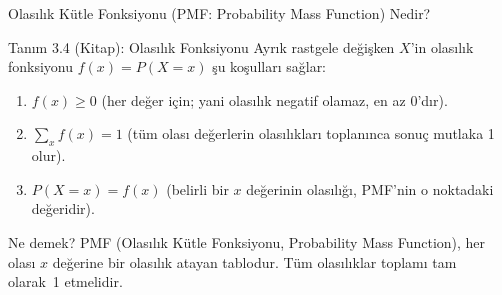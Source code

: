 ﻿\documentclass[light]{lutbeamer}
\begin{document}
\begin{frame}{Olasılık Kütle Fonksiyonu (PMF: Probability Mass Function) Nedir?}
\begin{block}{Tanım 3.4 (Kitap): Olasılık Fonksiyonu}
  Ayrık rastgele değişken $X$'in olasılık fonksiyonu $f(x) = P(X = x)$ şu koşulları sağlar:
  \begin{enumerate}
    \item $f(x) \ge 0$ \quad (her değer için; yani olasılık negatif olamaz, en az 0'dır).
    \item $\displaystyle\sum_{x} f(x) = 1$ \quad (tüm olası değerlerin olasılıkları toplanınca sonuç mutlaka 1 olur).
    \item $P(X = x) = f(x)$ \quad (belirli bir $x$ değerinin olasılığı, PMF'nin o noktadaki değeridir).
  \end{enumerate}
\end{block}

\begin{exampleblock}{Ne demek?}
  PMF (Olasılık Kütle Fonksiyonu, Probability Mass Function), her olası $x$ değerine bir olasılık atayan tablodur.
  Tüm olasılıklar toplamı tam olarak~1 etmelidir.
\end{exampleblock}
\end{frame}
\end{document}
